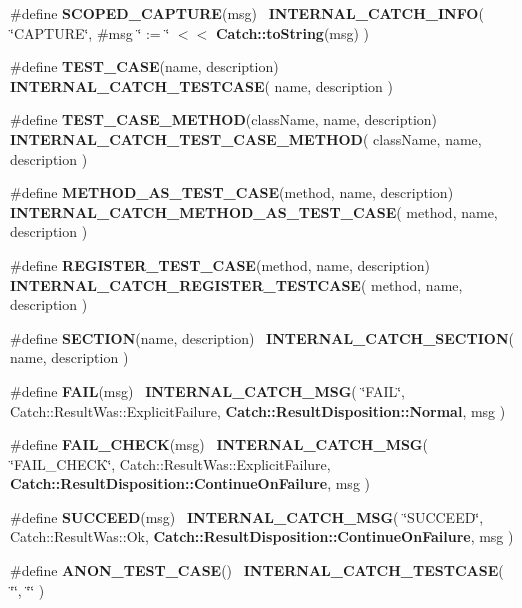 \begin{DoxyCompactItemize}
\item 
\#define \textbf{ S\+C\+O\+P\+E\+D\+\_\+\+C\+A\+P\+T\+U\+RE}(msg)~\textbf{ I\+N\+T\+E\+R\+N\+A\+L\+\_\+\+C\+A\+T\+C\+H\+\_\+\+I\+N\+FO}( \char`\"{}C\+A\+P\+T\+U\+RE\char`\"{}, \#msg \char`\"{} \+:= \char`\"{} $<$$<$ \textbf{ Catch\+::to\+String}(msg) )
\item 
\#define \textbf{ T\+E\+S\+T\+\_\+\+C\+A\+SE}(name,  description)~\textbf{ I\+N\+T\+E\+R\+N\+A\+L\+\_\+\+C\+A\+T\+C\+H\+\_\+\+T\+E\+S\+T\+C\+A\+SE}( name, description )
\item 
\#define \textbf{ T\+E\+S\+T\+\_\+\+C\+A\+S\+E\+\_\+\+M\+E\+T\+H\+OD}(class\+Name,  name,  description)~\textbf{ I\+N\+T\+E\+R\+N\+A\+L\+\_\+\+C\+A\+T\+C\+H\+\_\+\+T\+E\+S\+T\+\_\+\+C\+A\+S\+E\+\_\+\+M\+E\+T\+H\+OD}( class\+Name, name, description )
\item 
\#define \textbf{ M\+E\+T\+H\+O\+D\+\_\+\+A\+S\+\_\+\+T\+E\+S\+T\+\_\+\+C\+A\+SE}(method,  name,  description)~\textbf{ I\+N\+T\+E\+R\+N\+A\+L\+\_\+\+C\+A\+T\+C\+H\+\_\+\+M\+E\+T\+H\+O\+D\+\_\+\+A\+S\+\_\+\+T\+E\+S\+T\+\_\+\+C\+A\+SE}( method, name, description )
\item 
\#define \textbf{ R\+E\+G\+I\+S\+T\+E\+R\+\_\+\+T\+E\+S\+T\+\_\+\+C\+A\+SE}(method,  name,  description)~\textbf{ I\+N\+T\+E\+R\+N\+A\+L\+\_\+\+C\+A\+T\+C\+H\+\_\+\+R\+E\+G\+I\+S\+T\+E\+R\+\_\+\+T\+E\+S\+T\+C\+A\+SE}( method, name, description )
\item 
\#define \textbf{ S\+E\+C\+T\+I\+ON}(name,  description)~\textbf{ I\+N\+T\+E\+R\+N\+A\+L\+\_\+\+C\+A\+T\+C\+H\+\_\+\+S\+E\+C\+T\+I\+ON}( name, description )
\item 
\#define \textbf{ F\+A\+IL}(msg)~\textbf{ I\+N\+T\+E\+R\+N\+A\+L\+\_\+\+C\+A\+T\+C\+H\+\_\+\+M\+SG}( \char`\"{}F\+A\+IL\char`\"{}, Catch\+::\+Result\+Was\+::\+Explicit\+Failure, \textbf{ Catch\+::\+Result\+Disposition\+::\+Normal}, msg )
\item 
\#define \textbf{ F\+A\+I\+L\+\_\+\+C\+H\+E\+CK}(msg)~\textbf{ I\+N\+T\+E\+R\+N\+A\+L\+\_\+\+C\+A\+T\+C\+H\+\_\+\+M\+SG}( \char`\"{}F\+A\+I\+L\+\_\+\+C\+H\+E\+CK\char`\"{}, Catch\+::\+Result\+Was\+::\+Explicit\+Failure, \textbf{ Catch\+::\+Result\+Disposition\+::\+Continue\+On\+Failure}, msg )
\item 
\#define \textbf{ S\+U\+C\+C\+E\+ED}(msg)~\textbf{ I\+N\+T\+E\+R\+N\+A\+L\+\_\+\+C\+A\+T\+C\+H\+\_\+\+M\+SG}( \char`\"{}S\+U\+C\+C\+E\+ED\char`\"{}, Catch\+::\+Result\+Was\+::\+Ok, \textbf{ Catch\+::\+Result\+Disposition\+::\+Continue\+On\+Failure}, msg )
\item 
\#define \textbf{ A\+N\+O\+N\+\_\+\+T\+E\+S\+T\+\_\+\+C\+A\+SE}()~\textbf{ I\+N\+T\+E\+R\+N\+A\+L\+\_\+\+C\+A\+T\+C\+H\+\_\+\+T\+E\+S\+T\+C\+A\+SE}( \char`\"{}\char`\"{}, \char`\"{}\char`\"{} )
$$
\end{DoxyCompactItemize}
